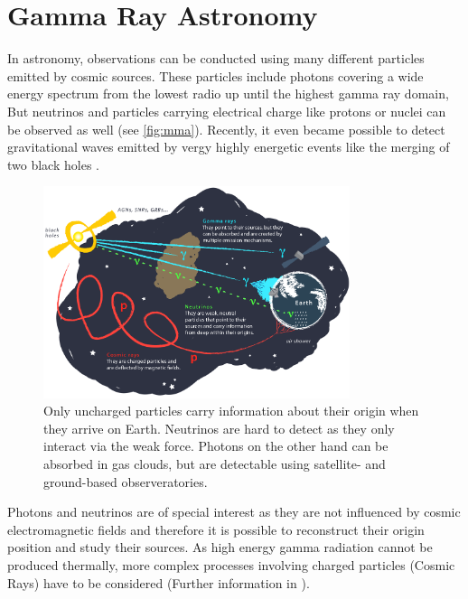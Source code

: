 \chapter{Gamma Ray Astronomy}
In astronomy, observations can be conducted using many different particles emitted by cosmic sources. 
These particles include photons covering a wide energy spectrum from the lowest radio up until the highest gamma ray domain,
But neutrinos and particles carrying electrical charge like protons or nuclei can be observed as well (see \autoref{fig:mma}). 
Recently, it even became possible to detect gravitational waves emitted by vergy highly energetic events like the merging of two black holes \cite{PhysRevLett.116.061102}.
\begin{figure}
    \centering
    \includegraphics[width=0.8\textwidth]{images/cosmic_messengers.png}
    \caption{Only uncharged particles carry information about their origin when they arrive on Earth.
        Neutrinos are hard to detect as they only interact via the weak force.
        Photons on the other hand can be absorbed in gas clouds, but are detectable using satellite- and ground-based observeratories.
    }
    \label{fig:mma}
\end{figure}

Photons and neutrinos are of special interest as they are not influenced by cosmic electromagnetic fields and therefore it is possible to reconstruct their origin 
position and study their sources.
As high energy gamma radiation cannot be produced thermally, more complex processes involving charged particles (Cosmic Rays) have to be considered 
(Further information in \cite{s_funk}).

